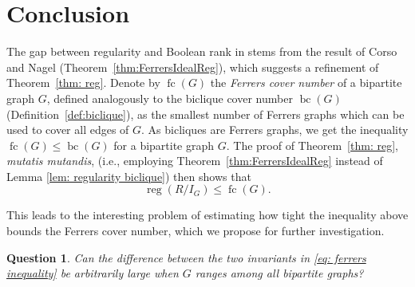 \documentclass[11pt,letterpaper, reqno]{amsart}
\newtheorem{question}[theorem]{Question}
\theoremstyle{definition}
\theoremstyle{remark}
\DeclareMathOperator{\reg}{reg}
\DeclareMathOperator{\bc}{bc}
\DeclareMathOperator{\brank}{brank}
\DeclareMathOperator{\fc}{fc}
\numberwithin{equation}{section}
\begin{document}
\section{Conclusion}
The gap between regularity and Boolean rank in  stems from the result of Corso and Nagel (Theorem~\ref{thm:FerrersIdealReg}), which suggests a refinement of Theorem~\ref{thm: reg}. Denote by $\fc(G)$ the \emph{Ferrers cover number} of a bipartite graph $G$, defined analogously to the biclique cover number $\bc(G)$ (Definition~\ref{def:biclique}), as the smallest number of Ferrers graphs which can be used to cover all edges of $G$. As bicliques are Ferrers graphs, we get the inequality $\fc(G) \leq \bc(G)$ for a bipartite graph $G$.
The proof of Theorem~\ref{thm: reg}, \emph{mutatis mutandis}, (i.e., employing Theorem~\ref{thm:FerrersIdealReg} instead of Lemma \ref{lem: regularity biclique}) then shows that 
\begin{equation}\label{eq: ferrers inequality}
    \reg(R/I_G) \leq \fc(G).
\end{equation} 


This leads to the interesting problem of estimating how tight the inequality above bounds the Ferrers cover number,
which we propose for further investigation.

\begin{question}
    Can the difference between the two invariants in \eqref{eq: ferrers inequality} be arbitrarily large when $G$ ranges among all bipartite graphs?
\end{question}



\end{document}
